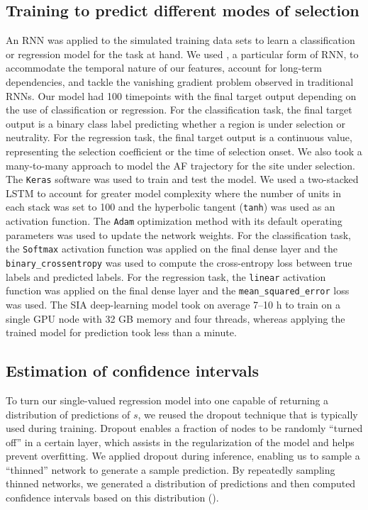 \subsection{Training  to predict different modes of selection}
An \ac{RNN} was applied to the simulated training data sets to learn a classification or regression model for the task at hand. We used , a particular form of \ac{RNN}, to accommodate the temporal nature of our features, account for long-term dependencies, and tackle the vanishing gradient problem observed in traditional \acp{RNN}. Our model had 100 timepoints with the final target output depending on the use of classification or regression. For the classification task, the final target output is a binary class label predicting whether a region is under selection or neutrality. For the regression task, the final target output is a continuous value, representing the selection coefficient or the time of selection onset. We also took a many-to-many approach to model the \ac{AF} trajectory for the site under selection. The \texttt{Keras} software was used to train and test the model. We used a two-stacked \ac{LSTM} to account for greater model complexity where the number of units in each stack was set to 100 and the hyperbolic tangent (\texttt{tanh}) was used as an activation function. The \texttt{Adam} optimization method with its default operating parameters was used to update the network weights. For the classification task, the \texttt{Softmax} activation function was applied on the final dense layer and the \texttt{binary\_crossentropy} was used to compute the cross-entropy loss between true labels and predicted labels. For the regression task, the \texttt{linear} activation function was applied on the final dense layer and the \texttt{mean\_squared\_error} loss was used. The \ac{SIA} deep-learning model took on average 7–10 h to train on a single \acs{GPU} node with 32 GB memory and four threads, whereas applying the trained model for prediction took less than a minute.

\subsection{Estimation of confidence intervals}
To turn our single-valued regression model into one capable of returning a distribution of predictions of $s$, we reused the dropout technique that is typically used during training. Dropout enables a fraction of nodes to be randomly “turned off” in a certain layer, which assists in the regularization of the model and helps prevent overfitting. We applied dropout during inference, enabling us to sample a “thinned” network to generate a sample prediction. By repeatedly sampling thinned networks, we generated a distribution of predictions and then computed confidence intervals based on this distribution (\cite{gal_dropout_2016}).

